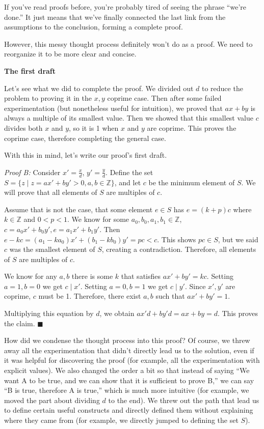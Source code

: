 \documentclass[11pt]{article}
\begin{document}
    If you've read proofs before, you're probably tired of seeing the phrase
    ``we're done.'' It just means that we've finally connected the last link from the
    assumptions to the conclusion, forming a complete proof.
    
    However, this messy thought process definitely won't do as a proof. We need to
    reorganize it to be more clear and concise.


    \textbf{The first draft}
    
    Let's see what we did to complete the proof. We divided out $d$ to reduce the problem
    to proving it in the $x,y$ coprime case. Then after some failed experimentation
    (but nonetheless useful for intuition), we proved that $ax+by$ is always a multiple
    of its smallest value. Then we showed that this smallest value $c$ divides both $x$
    and $y$, so it is 1 when $x$ and $y$ are coprime. This proves the coprime case,
    therefore completing the general case.
    
    With this in mind, let's write our proof's first draft.
    
    \textit{Proof B:} Consider $x'=\frac xd$, $y'=\frac yd$. Define the set
    $S=\{z\mid z=ax'+by'>0,a,b\in\mathbb Z\}$, and let $c$ be the minimum element of $S$.
    We will prove that all elements of $S$ are multiples of $c$.
    
    Assume that is not the case, that some element $e\in S$ has $e=(k+p)c$ where
    $k\in\mathbb Z$ and $0<p<1$. We know for some $a_0,b_0,a_1,b_1\in\mathbb Z$,
    $c=a_0x'+b_0y',e=a_1x'+b_1y'$. Then $e-kc=(a_1-ka_0)x'+(b_1-kb_0)y'=pc<c$. This
    shows $pc\in S$, but we said $c$ was the smallest element of $S$, creating a 
    contradiction. Therefore, all elements of $S$ are multiples of $c$.
    
    We know for any $a,b$ there is some $k$ that satisfies $ax'+by'=kc$. Setting
    $a=1,b=0$ we get $c\mid x'$. Setting $a=0,b=1$ we get $c\mid y'$. Since $x',y'$
    are coprime, $c$ must be 1. Therefore, there exist $a,b$ such that $ax'+by'=1$.
    
    Multiplying this equation by $d$, we obtain $ax'd+by'd=ax+by=d$. This proves
    the claim. $\blacksquare$
    
    How did we condense the thought process into this proof? Of course, we threw away
    all the experimentation that didn't directly lead us to the solution, even if it
    was helpful for discovering the proof (for example, all the experimentation with
    explicit values). We also changed the order a bit so that instead of saying
    ``We want A to be true, and we can show that it is sufficient to prove B,''
    we can say ``B is true, therefore A is true,'' which is much more intuitive
    (for example, we moved the part about dividing $d$ to the end). We threw out
    the path that lead us to define certain useful constructs and directly defined 
    them without explaining where they came from (for example, we directly jumped
    to defining the set $S$).
    
\end{document}
